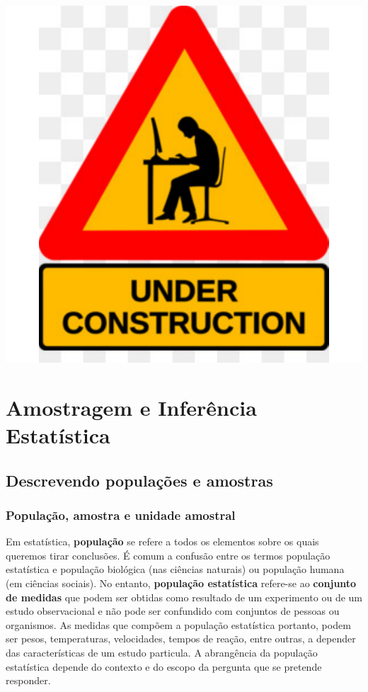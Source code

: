 \documentclass[
]{book}
\begin{document}
\begin{center}\includegraphics{probest-cambientais_files/figure-latex/unnamed-chunk-164-1} \end{center}

\hypertarget{part-amostragem-e-inferuxeancia-estatuxedstica}{%
\part{Amostragem e Inferência Estatística}\label{part-amostragem-e-inferuxeancia-estatuxedstica}}

\hypertarget{popamostra}{%
\chapter{Descrevendo populações e amostras}\label{popamostra}}

\hypertarget{populauxe7uxe3o-amostra-e-unidade-amostral}{%
\section{População, amostra e unidade amostral}\label{populauxe7uxe3o-amostra-e-unidade-amostral}}

Em estatística, \textbf{população} se refere a todos os elementos sobre os quais queremos tirar conclusões. É comum a confusão entre os termos população estatística e população biológica (nas ciências naturais) ou população humana (em ciências sociais). No entanto, \textbf{população estatística} refere-se ao \textbf{conjunto de medidas} que podem ser obtidas como resultado de um experimento ou de um estudo observacional e não pode ser confundido com conjuntos de pessoas ou organismos. As medidas que compõem a população estatística portanto, podem ser pesos, temperaturas, velocidades, tempos de reação, entre outras, a depender das características de um estudo particula. A abrangência da população estatística depende do contexto e do escopo da pergunta que se pretende responder.
\end{document}
